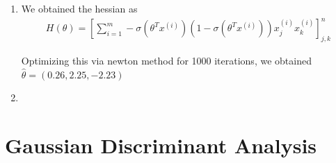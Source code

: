 \documentclass[12pt]{article}
\begin{document}
\begin{enumerate}
    \item We obtained the hessian as 
    \begin{align*}
        H(\theta) = \left[ \sum_{i=1}^m -\sigma(\theta^T x^{(i)})(1-\sigma(\theta^T x^{(i)})) x_j^{(i)}x_k^{(i)} \right]_{j,k}^n
    \end{align*}

    Optimizing this via newton method for 1000 iterations, we obtained $\hat{\theta} = (0.26,2.25,-2.23)$

    \item \begin{center}\end{center}

\end{enumerate}

\pagebreak

\section*{Gaussian Discriminant Analysis}
\end{document}
